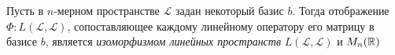 \begin{theorem}
  Пусть в $n$-мерном пространстве $\mathcal{L}$ задан некоторый базис $b$. Тогда отображение $\Phi: L\left( \mathcal{L}, \mathcal{L} \right)$, сопоставляющее каждому линейному оператору его матрицу в базисе $b$, является  \textit{изоморфизмом линейных пространств} $L (\mathcal{L}, \mathcal{L})$ и $M_n(\mathbb{R})$ 
\end{theorem}


